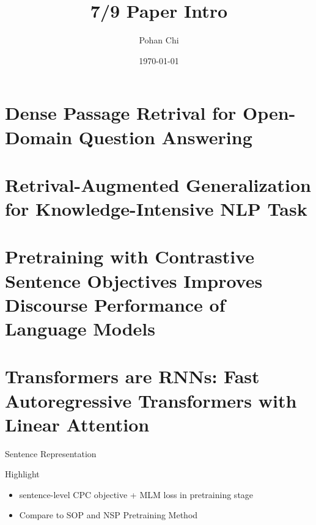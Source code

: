 \documentclass[10pt]{beamer}
\title{7/9 Paper Intro}
\subtitle{}
\author{Pohan Chi}
\date{\today}
\begin{document}
\maketitle

\maketoc

\section{Dense Passage Retrival for Open-Domain Question Answering}

\section{Retrival-Augmented Generalization for Knowledge-Intensive NLP Task}

\section{Pretraining with Contrastive Sentence Objectives Improves Discourse Performance of Language Models}

\section{Transformers are RNNs: Fast Autoregressive Transformers with Linear Attention}

\begin{frame}[t]{Sentence Representation}

    \begin{figure}
        \begin{center}
        \end{center}
    \end{figure}
    \begin{center}
    \end{center}
\end{frame}

\begin{frame}{Highlight}

    \begin{itemize}
        \item sentence-level CPC objective + MLM loss in pretraining stage
        \item Compare to SOP and NSP Pretraining Method
    \end{itemize}

\end{frame}
\end{document}
